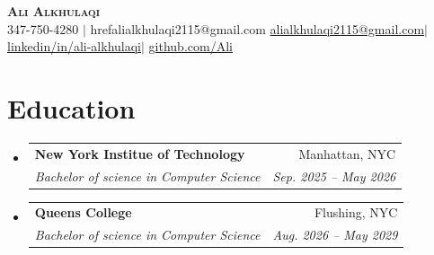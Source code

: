 \documentclass[letterpaper, 11pt]{article}
\makeatletter
\newcommand{\resumeSubheading}[4]{
  \vspace{-2pt}\item
    \begin{tabular*}{0.97\textwidth}[t]{l@{\extracolsep{\fill}}r}
      \textbf{#1} & #2 \\
      \textit{\small#3} & \textit{\small #4} \\
    \end{tabular*}\vspace{-7pt}
}
\newcommand{\resumeSubHeadingListStart}{\begin{itemize}[leftmargin=0.15in, label={}]}
\newcommand{\resumeSubHeadingListEnd}{\end{itemize}}
\makeatother
\begin{document}
\begin{center}
    \textbf{\Huge \scshape Ali Alkhulaqi}\\ \vspace {1pt}
    \small 347-750-4280 $|$ href{alialkhulaqi2115@gmail.com} {\underline{alialkhulaqi2115@gmail.com}}$|$
    \href{https://www.linkedin.com/in/ali-alkhulaqi-19a1a3315/} {\underline{linkedin/in/ali-alkhulaqi}}$|$
    \href{https://github.com/AliA749} {\underline{github.com/Ali}}
\end{center}
\section{Education}
    \resumeSubHeadingListStart
        \resumeSubheading
        {New York Institue of Technology}{Manhattan, NYC}
        {Bachelor of science in Computer Science}{Sep. 2025 -- May 2026}
        \resumeSubheading
        {Queens College}{Flushing, NYC}
        {Bachelor of science in Computer Science}{Aug. 2026 -- May 2029}
    \resumeSubHeadingListEnd
\end{document}
